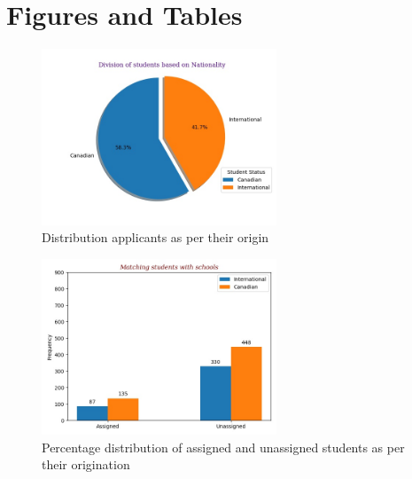 \documentclass[twocolumn]{bmcart}
\begin{document}
	\section*{Figures and Tables}
	\begin{figure}[h!]
		\centering
		\includegraphics[width=7cm]{pie.jpg}
		\caption{Distribution applicants as per their origin}
		\label{fig:Distribution}
	\end{figure}
	
	\begin{figure}[h!]
		\centering
		\includegraphics[width=7cm]{plot.jpg}
		\caption{Percentage distribution of assigned and unassigned students as per their origination}
		\label{fig:allocation}
	\end{figure}
	
\end{document}
